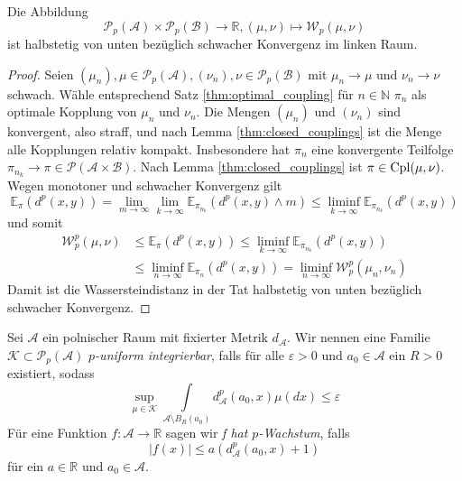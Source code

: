 \begin{lemma}\label{thm:semicontinuous_wasserstein}
Die Abbildung 
$$\mathcal{P}_p(\mathcal{A})\times \mathcal{P}_p(\mathcal{B}) \rightarrow \mathbb{R}, (\mu, \nu) \mapsto \mathcal{W}_p(\mu, \nu)$$
ist halbstetig von unten bezüglich schwacher Konvergenz im linken Raum.
\end{lemma}
\begin{proof}
    Seien $(\mu_n), \mu \in \mathcal{P}_p(\mathcal{A}), (\nu_n), \nu \in \mathcal{P}_p(\mathcal{B})$ mit $\mu_n \rightarrow \mu$ und $\nu_n \rightarrow \nu$ schwach. Wähle entsprechend Satz \ref{thm:optimal_coupling} für $n \in \mathbb{N}$ $\pi_n$ als optimale Kopplung von $\mu_n$ und $\nu_n$. Die Mengen $(\mu_n)$ und $(\nu_n)$ sind konvergent, also straff, und nach Lemma \ref{thm:closed_couplings} ist die Menge alle Kopplungen relativ kompakt. Insbesondere hat $\pi_n$ eine konvergente Teilfolge $\pi_{n_k} \rightarrow \pi \in \mathcal{P}(\mathcal{A}\times\mathcal{B})$. Nach Lemma \ref{thm:closed_couplings} ist $\pi \in \operatorname{Cpl}(\mu, \nu)$. 
    Wegen monotoner und schwacher Konvergenz gilt
    $$\mathbb{E}_\pi(d^p(x,y)) = \lim_{m\rightarrow\infty}\lim_{k\rightarrow\infty} \mathbb{E}_{\pi_{n_k}}(d^p(x,y) \wedge m) \leq \liminf_{k\rightarrow\infty} \mathbb{E}_{\pi_{n_k}}(d^p(x,y))$$
    und somit
    \begin{align*}
        \mathcal{W}_p^p(\mu, \nu) &\leq \mathbb{E}_\pi(d^p(x,y)) \leq \liminf_{k\rightarrow\infty} \mathbb{E}_{\pi_{n_k}}(d^p(x,y)) \\
        &\leq \liminf_{n\rightarrow\infty}\mathbb{E}_{\pi_n}(d^p(x,y)) = \liminf_{n\rightarrow\infty} \mathcal{W}_p^p(\mu_n, \nu_n)
    \end{align*}
    Damit ist die Wassersteindistanz in der Tat halbstetig von unten bezüglich schwacher Konvergenz.
\end{proof}
\begin{definition}
    Sei $\mathcal{A}$ ein polnischer Raum mit fixierter Metrik $d_\mathcal{A}$. Wir nennen eine Familie $\mathcal{K} \subset \mathcal{P}_p(\mathcal{A})$ \emph{$p$-uniform integrierbar}, falls für alle $\varepsilon>0$ und $a_0 \in \mathcal{A}$ ein $R>0$ existiert, sodass
    $$\sup\limits_{\mu \in \mathcal{K}} \int\limits_{\mathcal{A}\setminus B_{R}(a_0)} d_\mathcal{A}^p(a_0, x)\mu(dx) \leq \varepsilon $$
    Für eine Funktion $f: \mathcal{A} \rightarrow \mathbb{R}$ sagen wir \emph{f hat $p$-Wachstum}, falls 
    $$|f(x)|\leq a(d_\mathcal{A}^p(a_0, x) + 1)$$
    für ein $a\in \mathbb{R}$ und $a_0 \in \mathcal{A}$.
\end{definition}
